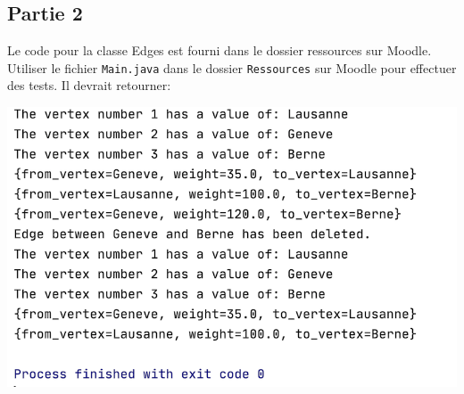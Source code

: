 \newpage

\subsection{Partie 2}
Le code pour la classe Edges est fourni dans le dossier ressources sur Moodle.
Utiliser le fichier \lstinline{Main.java} dans le dossier \lstinline{Ressources} sur Moodle pour effectuer des tests. Il devrait retourner:

\includegraphics[]{ressources/sortie_juste.PNG}


